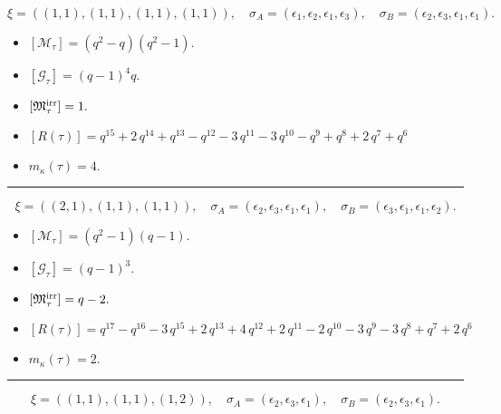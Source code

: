 \documentclass[10pt,a4paper]{amsart}
\begin{document}
$$\xi = ({(1, 1), (1, 1)}, {(1, 1), (1, 1)}),\quad \sigma_A = ({{\epsilon_1}, {\epsilon_2}}, {{\epsilon_1}, {\epsilon_3}}),\quad \sigma_B = ({{\epsilon_2}, {\epsilon_3}}, {{\epsilon_1}, {\epsilon_1}}).$$

\begin{itemize}
 \item $[\mathcal{M}_{\tau}] = {\left(q^{2} - q\right)} {\left(q^{2} - 1\right)} .$

 \item $[\mathcal{G}_{\tau}] = {\left(q - 1\right)}^{4} q .$

 \item $[{\frak M}_{\tau}^{\textrm{irr}}] = 1 .$

 \item $[R(\tau)] = q^{15} + 2 \, q^{14} + q^{13} - q^{12} - 3 \, q^{11} - 3 \, q^{10} - q^{9} + q^{8} + 2 \, q^{7} + q^{6} $

 \item $m_{\kappa}(\tau) = 4 .$

 \end{itemize}
\noindent\rule{8cm}{0.4pt}

$$\xi = ({(2, 1)}, {(1, 1), (1, 1)}),\quad \sigma_A = ({{\epsilon_2, \epsilon_3}}, {{\epsilon_1}, {\epsilon_1}}),\quad \sigma_B = ({{\epsilon_3, \epsilon_1}}, {{\epsilon_1}, {\epsilon_2}}).$$

\begin{itemize}
 \item $[\mathcal{M}_{\tau}] = {\left(q^{2} - 1\right)} {\left(q - 1\right)} .$

 \item $[\mathcal{G}_{\tau}] = {\left(q - 1\right)}^{3} .$

 \item $[{\frak M}_{\tau}^{\textrm{irr}}] = q - 2 .$

 \item $[R(\tau)] = q^{17} - q^{16} - 3 \, q^{15} + 2 \, q^{13} + 4 \, q^{12} + 2 \, q^{11} - 2 \, q^{10} - 3 \, q^{9} - 3 \, q^{8} + q^{7} + 2 \, q^{6} $

 \item $m_{\kappa}(\tau) = 2 .$

 \end{itemize}
\noindent\rule{8cm}{0.4pt}

$$\xi = ({(1, 1), (1, 1)}, {(1, 2)}),\quad \sigma_A = ({{\epsilon_2}, {\epsilon_3}}, {{\epsilon_1}}),\quad \sigma_B = ({{\epsilon_2}, {\epsilon_3}}, {{\epsilon_1}}).$$
\end{document}
